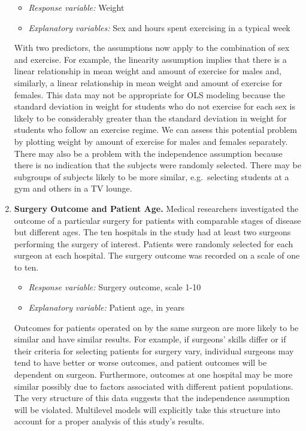 \documentclass[
]{krantz}
\providecommand{\tightlist}{%
  \setlength{\itemsep}{0pt}\setlength{\parskip}{0pt}}
\begin{document}
\begin{enumerate}
  \begin{itemize}
  \tightlist
  \item
    \emph{Response variable:} Weight
  \item
    \emph{Explanatory variables:} Sex and hours spent exercising in a typical week\\
  \end{itemize}

  With two predictors, the assumptions now apply to the combination of sex and exercise. For example, the linearity assumption implies that there is a linear relationship in mean weight and amount of exercise for males and, similarly, a linear relationship in mean weight and amount of exercise for females. This data may not be appropriate for OLS modeling because the standard deviation in weight for students who do not exercise for each sex is likely to be considerably greater than the standard deviation in weight for students who follow an exercise regime. We can assess this potential problem by plotting weight by amount of exercise for males and females separately. There may also be a problem with the independence assumption because there is no indication that the subjects were randomly selected. There may be subgroups of subjects likely to be more similar, e.g.~selecting students at a gym and others in a TV lounge.
\item
  \textbf{Surgery Outcome and Patient Age.} Medical researchers investigated the outcome of a particular surgery for patients with comparable stages of disease but different ages. The ten hospitals in the study had at least two surgeons performing the surgery of interest. Patients were randomly selected for each surgeon at each hospital. The surgery outcome was recorded on a scale of one to ten.

  \begin{itemize}
  \tightlist
  \item
    \emph{Response variable:} Surgery outcome, scale 1-10
  \item
    \emph{Explanatory variable:} Patient age, in years\\
  \end{itemize}

  Outcomes for patients operated on by the same surgeon are more likely to be similar and have similar results. For example, if surgeons' skills differ or if their criteria for selecting patients for surgery vary, individual surgeons may tend to have better or worse outcomes, and patient outcomes will be dependent on surgeon. Furthermore, outcomes at one hospital may be more similar possibly due to factors associated with different patient populations. The very structure of this data suggests that the independence assumption will be violated. Multilevel models will explicitly take this structure into account for a proper analysis of this study's results.
\end{enumerate}
\end{document}
